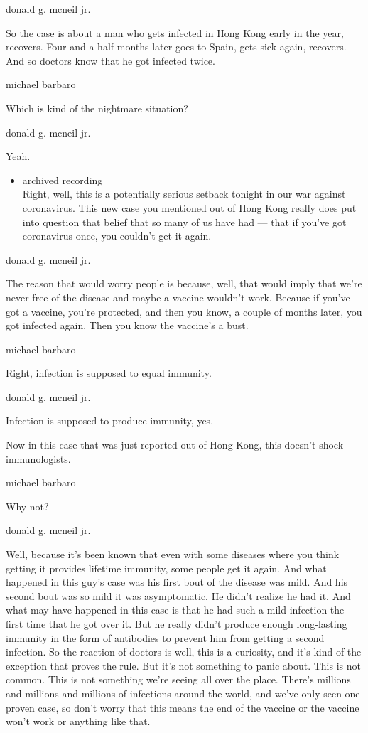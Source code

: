 donald g. mcneil jr.

So the case is about a man who gets infected in Hong Kong early in the
year, recovers. Four and a half months later goes to Spain, gets sick
again, recovers. And so doctors know that he got infected twice.

michael barbaro

Which is kind of the nightmare situation?

donald g. mcneil jr.

Yeah.

\begin{itemize}
\tightlist
\item
  archived recording\\
  Right, well, this is a potentially serious setback tonight in our war
  against coronavirus. This new case you mentioned out of Hong Kong
  really does put into question that belief that so many of us have had
  --- that if you've got coronavirus once, you couldn't get it again.
\end{itemize}

donald g. mcneil jr.

The reason that would worry people is because, well, that would imply
that we're never free of the disease and maybe a vaccine wouldn't work.
Because if you've got a vaccine, you're protected, and then you know, a
couple of months later, you got infected again. Then you know the
vaccine's a bust.

michael barbaro

Right, infection is supposed to equal immunity.

donald g. mcneil jr.

Infection is supposed to produce immunity, yes.

Now in this case that was just reported out of Hong Kong, this doesn't
shock immunologists.

michael barbaro

Why not?

donald g. mcneil jr.

Well, because it's been known that even with some diseases where you
think getting it provides lifetime immunity, some people get it again.
And what happened in this guy's case was his first bout of the disease
was mild. And his second bout was so mild it was asymptomatic. He didn't
realize he had it. And what may have happened in this case is that he
had such a mild infection the first time that he got over it. But he
really didn't produce enough long-lasting immunity in the form of
antibodies to prevent him from getting a second infection. So the
reaction of doctors is well, this is a curiosity, and it's kind of the
exception that proves the rule. But it's not something to panic about.
This is not common. This is not something we're seeing all over the
place. There's millions and millions and millions of infections around
the world, and we've only seen one proven case, so don't worry that this
means the end of the vaccine or the vaccine won't work or anything like
that.


